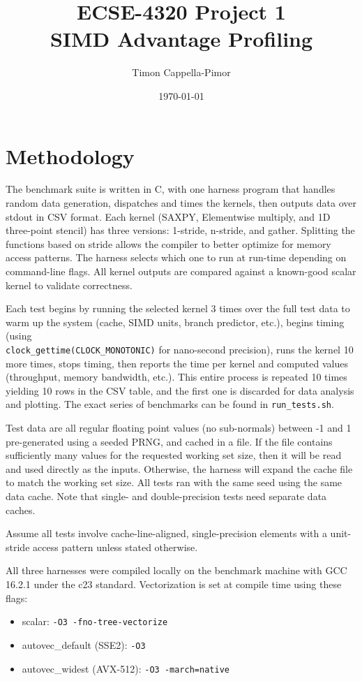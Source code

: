 \documentclass[12pt]{article}
\title{ECSE-4320 Project 1 \\ \large SIMD Advantage Profiling}
\author{Timon Cappella-Pimor}
\date{\today}
\begin{document}
\maketitle
\newpage
\section*{Methodology}

The benchmark suite is written in C, with one harness program that handles
random data generation, dispatches and times the kernels, then outputs data
over stdout in CSV format. Each kernel (SAXPY, Elementwise multiply, and 1D
three-point stencil) has three versions: 1-stride, n-stride, and gather.
Splitting the functions based on stride allows the compiler to better optimize
for memory access patterns. The harness selects which one to run at run-time
depending on command-line flags. All kernel outputs are compared against a
known-good scalar kernel to validate correctness.

Each test begins by running the selected kernel 3 times over the full test data
to warm up the system (cache, SIMD units, branch predictor, etc.), begins
timing (using \\ \texttt{clock\_gettime(CLOCK\_MONOTONIC)} for nano-second
precision), runs the kernel 10 more times, stops timing, then reports the time
per kernel and computed values (throughput, memory bandwidth, etc.). This
entire process is repeated 10 times yielding 10 rows in the CSV table, and the
first one is discarded for data analysis and plotting. The exact series of
benchmarks can be found in \texttt{run\_tests.sh}.

Test data are all regular floating point values (no sub-normals) between -1 and
1 pre-generated using a seeded PRNG, and cached in a file. If the file contains
sufficiently many values for the requested working set size, then it will be
read and used directly as the inputs. Otherwise, the harness will expand the
cache file to match the working set size. All tests ran with the same seed
using the same data cache. Note that single- and double-precision tests need
separate data caches.

Assume all tests involve cache-line-aligned, single-precision elements with a
unit-stride access pattern unless stated otherwise.

All three harnesses were compiled locally on the benchmark machine with GCC
16.2.1 under the c23 standard. Vectorization is set at compile time using these
flags:
\begin{itemize}
    \item scalar: \texttt{-O3 -fno-tree-vectorize}

    \item autovec\_default (SSE2): \texttt{-O3}

    \item autovec\_widest (AVX-512): \texttt{-O3 -march=native}
\end{itemize}
\end{document}
